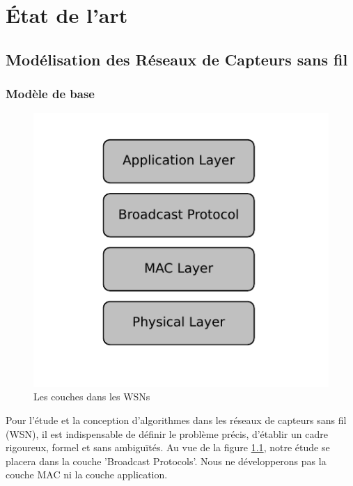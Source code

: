
\chapter{État de l'art}\label{etat_art}



\section{Modélisation des Réseaux de Capteurs sans fil}

\subsection{Modèle de base}

\begin{figure}[h]
\centering
\includegraphics[scale=0.9]{Etat_de_l'art/source/layer.pdf}
\caption{\label{Layer} Les couches dans les WSNs}
\end{figure}

Pour l'étude et la conception d'algorithmes dans les réseaux de capteurs sans fil (WSN), il est indispensable de définir le problème précis, d'établir un cadre rigoureux, formel et sans ambiguïtés. Au vue de la figure \ref{Layer}, notre étude se placera dans la couche 'Broadcast Protocols'. Nous ne développerons pas la couche MAC ni la couche application.\\

